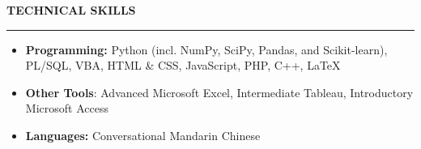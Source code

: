 \documentclass[11pt,letterpaper]{article}
\newcommand{\sectline}{\vspace{4pt}\hrule height 1.5pt\vspace{4pt}}
\newcommand{\sectspace}{\vspace{9pt}}
\begin{document}


\textbf{TECHNICAL SKILLS}\sectline
\begin{itemize}
	\item \textbf{Programming:} Python (incl. NumPy, SciPy, Pandas, and Scikit-learn), PL/SQL, VBA, HTML \& CSS, JavaScript, PHP, C++, \LaTeX
	\item \textbf{Other Tools}: Advanced Microsoft Excel, Intermediate Tableau, Introductory Microsoft Access
	\item \textbf{Languages:} Conversational Mandarin Chinese
\end{itemize}
\end{document}
